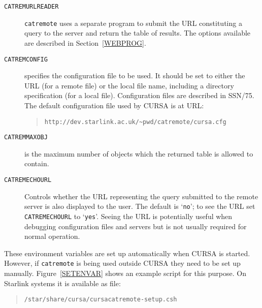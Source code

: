 \documentclass[twoside,11pt]{article}
\newcommand{\xref}[3]{#1}
\renewcommand{\_}{\texttt{\symbol{95}}}
\begin{document}
\begin{description}

  \item[{\tt CATREM\_URLREADER}] {\tt catremote} uses a separate program
   to submit the URL constituting a query to the server and return the
   table of results.  The options available are described in
   Section~\ref{WEBPROG}.

  \item[{\tt CATREM\_CONFIG}] specifies the configuration file to be used.
   It should be set to either the URL (for a remote file) or the local
   file name, including a directory specification (for a local file).
   Configuration files are described in \xref{SSN/75}{ssn75}{}\cite{SSN75}.
   The default configuration file used by CURSA is at URL:

  \begin{quote}
   {\tt http://dev.starlink.ac.uk/\~{}pwd/catremote/cursa.cfg}
  \end{quote}

  \item[{\tt CATREM\_MAXOBJ}] is the maximum number of objects which the
   returned table is allowed to contain.

  \item[{\tt CATREM\_ECHOURL}] Controls whether the URL representing the
   query submitted to the remote server is also displayed to the user.
   The default is `{\tt no}'; to see the URL set {\tt CATREM\_ECHOURL} to
   `{\tt yes}'.  Seeing the URL is potentially useful when debugging
   configuration files and servers but is not usually required for
   normal operation.

\end{description}

These environment variables are set up automatically when CURSA is started.
However, if {\tt catremote} is being used outside CURSA they need to be
set up manually.  
Figure~\ref{SETENVAR} shows an example script for this purpose.  On
Starlink systems it is available as file:

\begin{quote}
{\tt /star/share/cursa/cursacatremote-setup.csh}
\end{quote}
\end{document}
